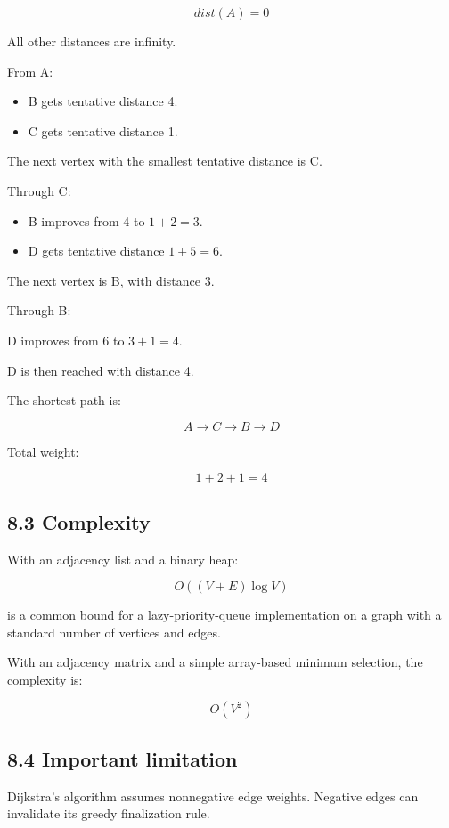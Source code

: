 \[
dist(A)=0
\]


All other distances are infinity.

From A:

\begin{itemize}
    \item B gets tentative distance 4.
    \item C gets tentative distance 1.
\end{itemize}

The next vertex with the smallest tentative distance is C.

Through C:

\begin{itemize}
    \item B improves from 4 to $1+2=3$.
    \item D gets tentative distance $1+5=6$.
\end{itemize}

The next vertex is B, with distance 3.

Through B:

\- D improves from 6 to $3+1=4$.

D is then reached with distance 4.

The shortest path is:


\[
\boxed{A\rightarrow C\rightarrow B\rightarrow D}
\]


Total weight:


\[
1+2+1=\boxed{4}
\]


\subsection{8.3 Complexity}

With an adjacency list and a binary heap:


\[
\boxed{O((V+E)\log V)}
\]


is a common bound for a lazy-priority-queue implementation on a graph with a standard number of vertices and edges.

With an adjacency matrix and a simple array-based minimum selection, the complexity is:


\[
\boxed{O(V^2)}
\]


\subsection{8.4 Important limitation}

Dijkstra's algorithm assumes nonnegative edge weights. Negative edges can invalidate its greedy finalization rule.

